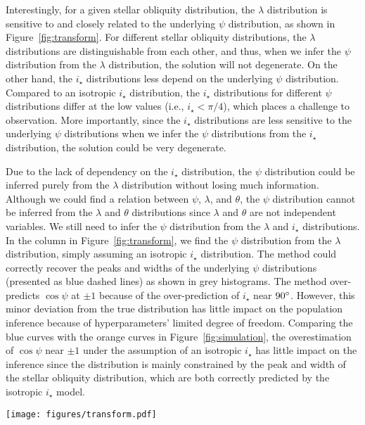 \documentclass[twocolumn,times]{aastex631}
\begin{document}
Interestingly, for a given stellar obliquity distribution, the $\lambda$ distribution is sensitive to and closely related to the underlying $\psi$ distribution, as shown in Figure~\ref{fig:transform}. For different stellar obliquity distributions, the $\lambda$ distributions are distinguishable from each other, and thus, when we infer the $\psi$ distribution from the $\lambda$ distribution, the solution will not degenerate.
On the other hand, the $i_\star$ distributions less depend on the underlying $\psi$ distribution. Compared to an isotropic $i_\star$ distribution, the $i_\star$ distributions for different $\psi$ distributions differ at the low values (i.e., $i_\star < \pi/4$), which places a challenge to observation. More importantly, since the $i_\star$ distributions are less sensitive to the underlying $\psi$ distributions when we infer the $\psi$ distributions from the $i_\star$ distribution, the solution could be very degenerate.

Due to the lack of dependency on the $i_\star$ distribution, the $\psi$ distribution could be inferred purely from the $\lambda$ distribution without losing much information. Although we could find a relation between $\psi$, $\lambda$, and $\theta$, the $\psi$ distribution cannot be inferred from the $\lambda$ and $\theta$ distributions since $\lambda$ and $\theta$ are not independent variables. We still need to infer the $\psi$ distribution from the $\lambda$ and $i_\star$ distributions.
In the  column in Figure~\ref{fig:transform}, we find the $\psi$ distribution from the $\lambda$ distribution, simply assuming an isotropic $i_\star$ distribution. The method could correctly recover the peaks and widths of the underlying $\psi$ distributions (presented as blue dashed lines) as shown in grey histograms. The method over-predicts $\cos{\psi}$ at $\pm 1$ because of the over-prediction of $i_\star$ near $90\mbox{$^\circ$}$. However, this minor deviation from the true distribution has little impact on the population inference because of hyperparameters' limited degree of freedom. Comparing the blue curves with the orange curves in Figure~\ref{fig:simulation}, the overestimation of $\cos{\psi}$ near $\pm1$ under the assumption of an isotropic $i_\star$ has little impact on the inference since the distribution is mainly constrained by the peak and width of the stellar obliquity distribution, which are both correctly predicted by the isotropic $i_\star$ model.

\begin{figure*}[ht!]
    \texttt{[image: figures/transform.pdf]}
    \caption{Simulated $\cos{\psi}$ distributions ( column) and their corresponding sky-projected stellar obliquity $\lambda$ ( column) and stellar inclination $i_\star$ ( column) distributions. The inferred $\cos{\psi}$ distributions assuming isotropic stellar inclinations are shown in the  column. The random samplings of $\lambda$ and $i_\star$ out of the $\cos{\psi}$ distributions are shown as grey histograms, and the numerical solutions are shown as blue curves.}
    \label{fig:transform}
\end{figure*}
\end{document}
